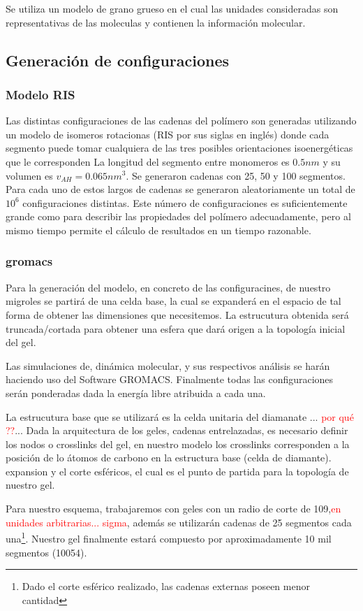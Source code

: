 Se utiliza un modelo de grano grueso en el cual las unidades consideradas son representativas de las moleculas y contienen la informaci\'on molecular.

\subsection{Generaci\'on de configuraciones}

\subsubsection{Modelo RIS}
Las distintas configuraciones de las cadenas del polímero son generadas utilizando un modelo de isomeros rotacionas (RIS por sus siglas en inglés) donde cada segmento puede tomar cualquiera de las tres posibles orientaciones isoenergéticas que le corresponden \addcite[Flory]
La longitud del segmento entre monomeros es $0.5 nm$ y su volumen es $v_{AH}= 0.065 nm^3$. Se generaron cadenas con 25, 50 y 100 segmentos. Para cada uno de estos largos de cadenas se generaron aleatoriamente un total de $10^6$ configuraciones distintas. Este número de configuraciones es suficientemente grande como para describir las propiedades del polímero adecuadamente, pero al mismo tiempo permite el cálculo de resultados en un tiempo razonable.

\subsubsection{gromacs}
Para la generaci\'on del modelo, en concreto de las configuracines, de nuestro migroles se partir\'a de una celda base, la cual se expander\'a en el espacio de tal forma de obtener las dimensiones que necesitemos.
La estrucutura obtenida  ser\'a truncada/cortada para obtener una esfera que dará origen a la topología inicial del gel.

Las simulaciones de, din\'amica molecular, y sus respectivos an\'alisis se harán haciendo uso del Software GROMACS. \addcite[11] 
Finalmente todas las configuraciones serán  ponderadas dada la energía libre atribuida a cada una. \addcite[12]

La estrucutura base que se utilizar\'a es la celda unitaria del diamanate ...\textcolor{red}{ por qu\'e ??}...
Dada la arquitectura de los geles, cadenas entrelazadas, es necesario definir los nodos o crosslinks del gel,  en nuestro modelo los crosslinks corresponden a la posici\'on de lo \'atomos de carbono en la estructura base (celda de diamante).
expansion y el corte esféricos, el cual es el punto de partida para la topolog\'ia de nuestro gel.

Para nuestro esquema, trabajaremos con geles con un radio de corte de 109,\textcolor{red}{en unidades arbitrarias... sigma}, además se utilizarán cadenas de 25 segmentos cada una\footnote{Dado el corte esférico realizado, las cadenas externas poseen menor cantidad}. Nuestro gel finalmente estará compuesto por aproximadamente 10 mil segmentos (10054).
